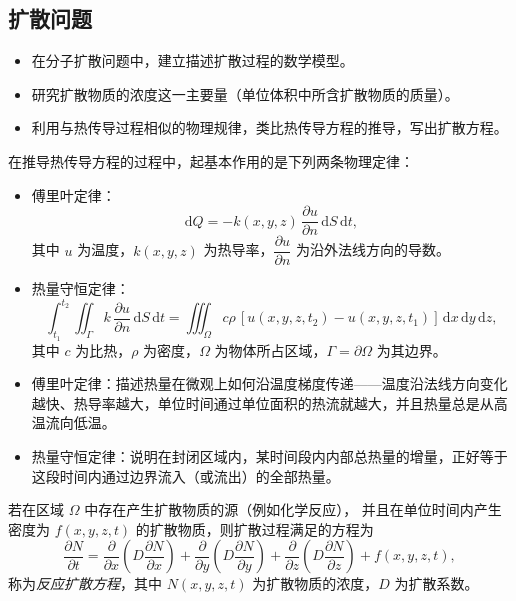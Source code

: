 \subsection{扩散问题}
\begin{itemize}
  \item 在分子扩散问题中，建立描述扩散过程的数学模型。
  \item 研究扩散物质的浓度这一主要量（单位体积中所含扩散物质的质量）。
  \item 利用与热传导过程相似的物理规律，类比热传导方程的推导，写出扩散方程。
\end{itemize}
\begin{definition}[傅里叶定律与热量守恒定律]
在推导热传导方程的过程中，起基本作用的是下列两条物理定律：

\begin{itemize}
  \item 傅里叶定律：
  \[
    \mathrm dQ = -k(x,y,z)\,\frac{\partial u}{\partial n}\,\mathrm dS\,\mathrm dt,
  \]
  其中 $u$ 为温度，$k(x,y,z)$ 为热导率，$\dfrac{\partial u}{\partial n}$ 为沿外法线方向的导数。

  \item 热量守恒定律：
  \[
    \int_{t_1}^{t_2}\iint_{\Gamma} k\,\frac{\partial u}{\partial n}\,\mathrm dS\,\mathrm dt
    =\iiint_{\Omega} c\rho\,[u(x,y,z,t_2)-u(x,y,z,t_1)]\,\mathrm d x\,\mathrm d y\,\mathrm d z,
  \]
  其中 $c$ 为比热，$\rho$ 为密度，$\Omega$ 为物体所占区域，$\Gamma=\partial\Omega$ 为其边界。
\end{itemize}
\end{definition}
\begin{itemize}
  \item 傅里叶定律：描述热量在微观上如何沿温度梯度传递——温度沿法线方向变化越快、热导率越大，单位时间通过单位面积的热流就越大，并且热量总是从高温流向低温。
  \item 热量守恒定律：说明在封闭区域内，某时间段内内部总热量的增量，正好等于这段时间内通过边界流入（或流出）的全部热量。
\end{itemize}
\begin{definition}[反应扩散方程]
若在区域 $\Omega$ 中存在产生扩散物质的源（例如化学反应），
并且在单位时间内产生密度为 $f(x,y,z,t)$ 的扩散物质，则扩散过程满足的方程为
\begin{equation}\label{eq:reaction-diffusion}
\frac{\partial N}{\partial t}
=\frac{\partial}{\partial x}\!\left(D\frac{\partial N}{\partial x}\right)
+\frac{\partial}{\partial y}\!\left(D\frac{\partial N}{\partial y}\right)
+\frac{\partial}{\partial z}\!\left(D\frac{\partial N}{\partial z}\right)
+f(x,y,z,t), \tag{1.20}
\end{equation}
称为\emph{反应扩散方程}，其中 $N(x,y,z,t)$ 为扩散物质的浓度，$D$ 为扩散系数。
\end{definition}

